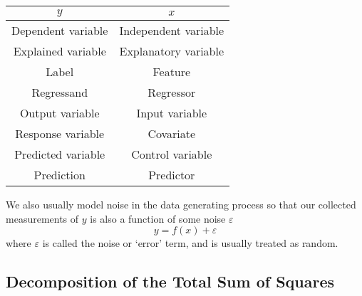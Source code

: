 \documentclass[11pt]{report} %
\begin{document}
\begin{table}[H]\centering
\begin{tabular}{|c|c|}
\hline 
$y$ & $x$ \\
\hline 
\hline 
Dependent variable & Independent variable \\
Explained variable & Explanatory variable \\
Label & Feature \\
Regressand & Regressor \\
Output variable & Input variable \\
Response variable & Covariate \\
Predicted variable & Control variable \\
Prediction & Predictor \\
\hline
\end{tabular}
\end{table}
We also usually model noise in the data generating process so that our collected measurements of $y$ is also a function of some noise $\varepsilon$
\begin{equation}
y = f\left(x\right) + \varepsilon
\end{equation}
where $\varepsilon$ is called the noise or `error' term, and is usually treated as random.

\subsection{Decomposition of the Total Sum of Squares}
\end{document}
